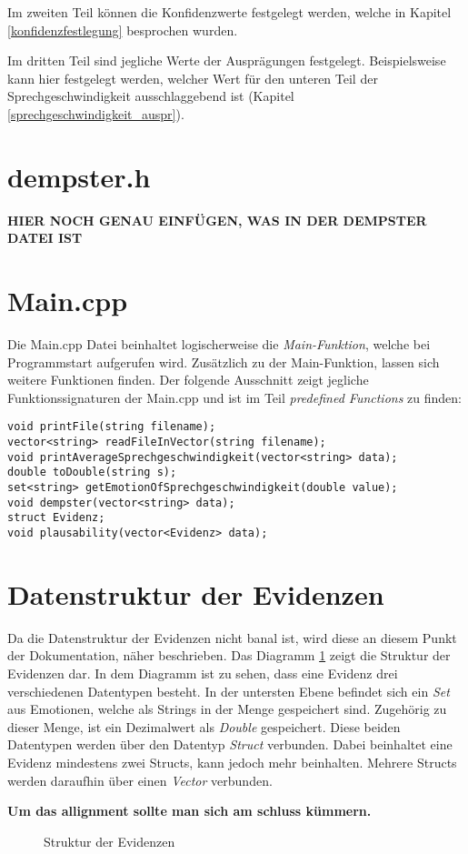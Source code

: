 Im zweiten Teil können die Konfidenzwerte festgelegt werden, welche in Kapitel \ref{konfidenzfestlegung} besprochen wurden.

Im dritten Teil sind jegliche Werte der Ausprägungen festgelegt. Beispielsweise kann hier festgelegt werden, welcher Wert für den unteren Teil der Sprechgeschwindigkeit ausschlaggebend ist (Kapitel \ref{sprechgeschwindigkeit_auspr}).

\section{dempster.h}
\textbf{HIER NOCH GENAU EINFÜGEN, WAS IN DER DEMPSTER DATEI IST}

\section{Main.cpp}
Die Main.cpp Datei beinhaltet logischerweise die \textit{Main-Funktion}, welche bei Programmstart aufgerufen wird.
Zusätzlich zu der Main-Funktion, lassen sich weitere Funktionen finden. Der folgende Ausschnitt zeigt jegliche Funktionssignaturen der Main.cpp und ist im Teil \textit{predefined Functions} zu finden: 

\begin{lstlisting}[caption=Predefined classes/functions aus der Main.cpp, label=Bsp.1]
void printFile(string filename);
vector<string> readFileInVector(string filename);
void printAverageSprechgeschwindigkeit(vector<string> data); 
double toDouble(string s); 
set<string> getEmotionOfSprechgeschwindigkeit(double value); 
void dempster(vector<string> data);
struct Evidenz;
void plausability(vector<Evidenz> data);
\end{lstlisting}

\section{Datenstruktur der Evidenzen}
Da die Datenstruktur der Evidenzen nicht banal ist, wird diese an diesem Punkt der Dokumentation, näher beschrieben. Das Diagramm \ref{diagramm_evidenzen} zeigt die Struktur der Evidenzen dar. In dem Diagramm ist zu sehen, dass eine Evidenz drei verschiedenen Datentypen besteht. In der untersten Ebene befindet sich ein \textit{Set} aus Emotionen, welche als Strings in der Menge gespeichert sind. Zugehörig zu dieser Menge, ist ein Dezimalwert als \textit{Double} gespeichert. Diese beiden Datentypen werden über den Datentyp \textit{Struct} verbunden. Dabei beinhaltet eine Evidenz mindestens zwei Structs, kann jedoch mehr beinhalten. Mehrere Structs werden daraufhin über einen \textit{Vector} verbunden.

\textbf{Um das allignment sollte man sich am schluss kümmern.}
\begin{figure}
\centering
\caption{Struktur der Evidenzen}
\label{diagramm_evidenzen}
\end{figure}

